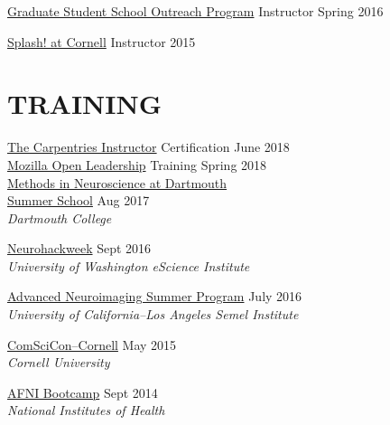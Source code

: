 \documentclass{dupre-cv}
\begin{document}
\vspace{12pt}
\href{https://sites.google.com/site/grasshopratcornell/}{Graduate Student School Outreach Program} Instructor \hfill Spring 2016

\vspace{12pt}
\href{https://cornell.learningu.org/}{Splash! at Cornell} Instructor \hfill 2015

\vspace{10pt}

\section{TRAINING}

\href{https://carpentries.github.io/instructor-training/}{The Carpentries Instructor} Certification \hfill June 2018 \\[0.025cm]

\href{https://mozilla.github.io/leadership-training/}{Mozilla Open Leadership} Training
\hfill Spring 2018 \\[0.025cm]

\href{https://summer-mind.github.io/}{Methods in Neuroscience at Dartmouth \\ Summer School}
\hfill Aug 2017 \\[0.15cm]
\textit{Dartmouth College}
\vspace{10pt}

\href{https://neurohackweek.github.io/}{Neurohackweek}
\hfill Sept 2016 \\[0.15cm]
\textit{University of Washington eScience Institute}
\vspace{10pt}

\href{http://www.brainmapping.org/NITP/Summer2016.php}{Advanced Neuroimaging Summer Program} \hfill July 2016 \\[0.15cm]
\textit{University of California--Los Angeles Semel Institute}
\vspace{10pt}

\href{https://comscicon.com/comscicon-cornell-2015}{ComSciCon--Cornell} \hfill May 2015 \\[0.15cm]
\textit{Cornell University}
\vspace{10pt}

\href{https://afni.nimh.nih.gov/bootcamp/}{AFNI Bootcamp} \hfill Sept 2014 \\[0.15cm]
\textit{National Institutes of Health}
\vspace{10pt}
\end{document}
